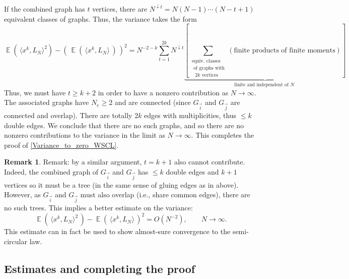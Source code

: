 \documentclass[letterpaper,11pt,oneside,reqno]{amsart}
\numberwithin{equation}{section}
\DeclareMathOperator{\EE}{\mathbb{E}}
\theoremstyle{definition}
\newtheorem{remark}[proposition]{Remark}
\begin{document}
If the combined graph has $ t $ vertices, there are $ N^{ \downarrow t } = N ( N - 1 ) \cdots ( N - t + 1 ) $ equivalent classes of graphs.  Thus, the variance takes the form
\begin{equation*}
\EE ( \, \langle x^k , L_N \rangle^2 ) - \left( \, \EE ( \, \langle x^k , L_N \rangle \, ) \, \right)^2 = N^{ -2 - k } \sum_{ t = 1 }^{ 2k } N^{ \downarrow t } \underbrace{ \left[ \sum_{ \substack{ \text{equiv. classes} \\ \text{ of graphs with} \\ \text{ $2k$ vertices } } } ( \text{finite products of finite moments} )\right] }_{ \text{ finite and independent of $N$ } }
\end{equation*}
Thus, we must have $ t \ge k + 2 $ in order to have a nonzero contribution as $ N \to \infty $.  
The associated graphs have $ N_e \ge 2 $ and are connected (since $ G_{ \vec{i} } $ and $ G_{ \vec{j} } $ are connected and overlap).
There are totally $ 2 k $ edges with multiplicities, thus  $\le k $ double edges.
We conclude that there are no such graphs, and so there are no nonzero contributions to the 
variance in the limit as $N\to\infty$. This 
completes the proof of \eqref{Variance_to_zero_WSCL}.

\begin{remark}
	Remark: by a similar argument, $ t = k + 1 $ also cannot contribute.
	Indeed, the combined graph of $ G_{ \vec{i} } $ and $ G_{ \vec{j} } $
	has $\le k$ double edges and $k+1$ vertices so it must be a tree
	(in the same sense of gluing edges as in  above).
	However, as $ G_{ \vec{i} } $ and $ G_{ \vec{j} } $ must also overlap (i.e., share common edges),
	there are no such trees.
	This implies a better estimate on the variance:
	\begin{equation*}
	\EE \left( \, \langle x^k , L_N \rangle^2 \, \right) - \EE \left( \, \langle x^k , L_N \rangle \, \right)^2 = O( N^{-2} ) ,
	\qquad
	N\to\infty.
	\end{equation*}
	This estimate can in fact be used to show almost-sure convergence to the semi-circular law.
\end{remark}


\subsection{Estimates and completing the proof} %
\label{sub:completing_the_proof_WSCL}
\end{document}
